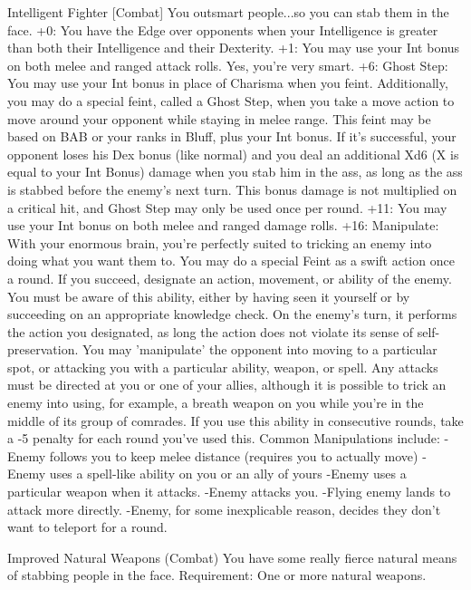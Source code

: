 Intelligent Fighter [Combat]
You outsmart people...so you can stab them in the face.
+0: You have the Edge over opponents when your Intelligence is greater than both their Intelligence and their Dexterity.
+1: You may use your Int bonus on both melee and ranged attack rolls. Yes, you're very smart.
+6: Ghost Step: You may use your Int bonus in place of Charisma when you feint. Additionally, you may do a special feint, called a Ghost Step, when you take a move action to move around your opponent while staying in melee range. This feint may be based on BAB or your ranks in Bluff, plus your Int bonus. If it's successful, your opponent loses his Dex bonus (like normal) and you deal an additional Xd6 (X is equal to your Int Bonus) damage when you stab him in the ass, as long as the ass is stabbed before the enemy's next turn. This bonus damage is not multiplied on a critical hit, and Ghost Step may only be used once per round.
+11: You may use your Int bonus on both melee and ranged damage rolls.
+16: Manipulate: With your enormous brain, you're perfectly suited to tricking an enemy into doing what you want them to. You may do a special Feint as a swift action once a round.
If you succeed, designate an action, movement, or ability of the enemy. You must be aware of this ability, either by having seen it yourself or by succeeding on an appropriate knowledge check. On the enemy's turn, it performs the action you designated, as long the action does not violate its sense of self-preservation.
You may 'manipulate' the opponent into moving to a particular spot, or attacking you with a particular ability, weapon, or spell. Any attacks must be directed at you or one of your allies, although it is possible to trick an enemy into using, for example, a breath weapon on you while you're in the middle of its group of comrades. If you use this ability in consecutive rounds, take a -5 penalty for each round you've used this.
Common Manipulations include:
-Enemy follows you to keep melee distance (requires you to actually move)
-Enemy uses a spell-like ability on you or an ally of yours
-Enemy uses a particular weapon when it attacks.
-Enemy attacks you.
-Flying enemy lands to attack more directly.
-Enemy, for some inexplicable reason, decides they don't want to teleport for a round.


Improved Natural Weapons (Combat)
You have some really fierce natural means of stabbing people in the face.
Requirement:
One or more natural weapons.

